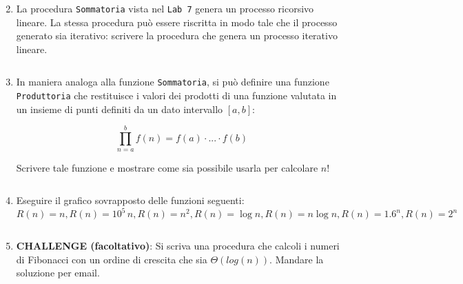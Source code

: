 \documentclass[11pt,a4]{article}
\newcommand{\mybox}[2]{$\quad$\fbox{
\begin{minipage}{#1cm}
\hfill\vspace{#2cm}
\end{minipage}
}}
\begin{document}
\begin{enumerate}
\mybox{15}{3.5}
 
\item La procedura {\tt Sommatoria} vista nel {\tt Lab 7} genera un processo ricorsivo lineare.
La stessa procedura può essere riscritta in modo tale che il processo generato sia iterativo:
scrivere la procedura che genera un processo iterativo lineare.

\mybox{15}{4.5}

\item In maniera analoga alla funzione {\tt Sommatoria}, si può definire una funzione {\tt Produttoria}
che restituisce i valori dei prodotti di una funzione valutata in un insieme di punti definiti da un dato intervallo $[a,b]$:

$$
	\prod_{n=a}^b f(n) = f(a)\cdot ... \cdot f(b)
$$

Scrivere tale funzione e mostrare come sia possibile usarla per calcolare $n!$

\mybox{15}{4.5}

\item Eseguire il grafico sovrapposto delle funzioni seguenti: 
$$R(n)=n, R(n)=10^5\,n, R(n)=n^2, R(n)=\log{n}, R(n)=n\log{n}, R(n)=1.6^n, R(n)=2^n$$

\mybox{15}{4.5}

\item {\bf CHALLENGE (facoltativo)}: Si scriva una procedura che calcoli i numeri di Fibonacci
con un ordine di crescita che sia $\Theta(log(n))$. Mandare la soluzione per email.
\end{enumerate}
\end{document}
